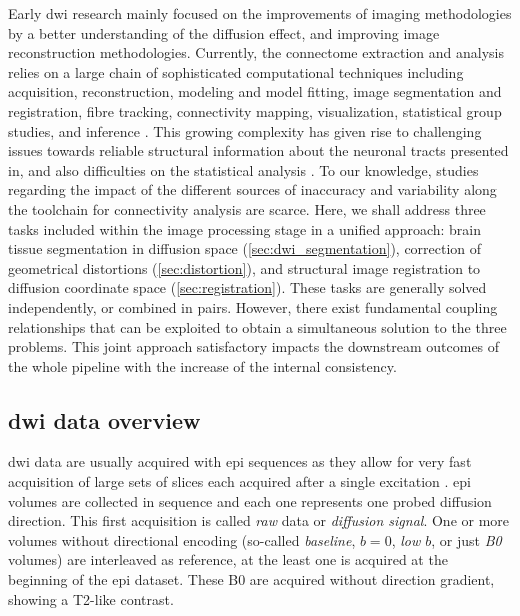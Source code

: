 Early \gls{dwi} research mainly focused on the improvements of imaging 
methodologies by a better understanding of the diffusion effect, and improving
image reconstruction methodologies. Currently, the connectome extraction 
and analysis relies on a large chain of sophisticated computational techniques
including acquisition, reconstruction, modeling and model fitting, image segmentation
and registration, fibre tracking, connectivity mapping, visualization, statistical 
group studies, and inference \citep{daducci_connectome_2012}. This growing complexity 
has given rise to challenging issues towards reliable structural information about 
the neuronal tracts presented in, and also difficulties on the statistical analysis 
\citep{bullmore_complex_2009,meskaldji_comparing_2013}. To our knowledge, studies 
regarding the impact of the different sources of inaccuracy and variability along
the toolchain for connectivity analysis \citep{jones_twenty-five_2010,
cheng_characteristics_2012,jones_white_2013} are scarce.
Here, we shall address three tasks included within  the image processing stage in 
a unified approach: brain tissue segmentation in diffusion space 
(\autoref{sec:dwi_segmentation}), 
correction of geometrical distortions (\autoref{sec:distortion}), and structural 
image registration to diffusion coordinate space (\autoref{sec:registration}). 
These tasks are generally
solved independently, or combined in pairs. However, there exist fundamental 
coupling relationships that can be exploited to obtain a simultaneous solution to 
the three problems. This joint approach satisfactory impacts the downstream
outcomes of the whole pipeline with the increase of the internal consistency.

\subsection{\Gls{dwi} data overview}
\label{sec:dwi_overview}
\gls{dwi} data are usually acquired with \gls{epi} sequences 
as they allow for very fast acquisition of large sets of slices each
acquired after a single excitation \citep{mukherjee_diffusion_2008,
soares_hitchhikers_2013}. \Gls{epi} volumes are collected
in sequence and each one represents one probed diffusion direction.
This first acquisition is called \emph{raw} data or \emph{diffusion
signal}. One or more volumes without directional encoding (so-called \emph{baseline},
$b = 0$, \emph{low $b$}, or just \emph{B0} volumes) are interleaved as
reference, at the least one is acquired at the beginning of the
\gls{epi} dataset. These B0 are acquired without direction gradient,
showing a T2-like contrast.

